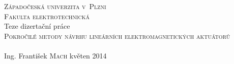 \begin{titlepage}
\begin{center}

\vspace*{3em}
\textsc{\LARGE Západočeská univerzita v~Plzni}\\[0.5em]
\textsc{\LARGE Fakulta elektrotechnická}\\[5em]

{\Large Teze dizertační práce}\vspace*{1em}
\HRule \\[1em]
{\huge \textsc{Pokročilé metody návrhu lineárních elektromagnetických aktuátorů} \\[0.4cm]}
\HRule \\[3em]

{\Large Ing. František \textsc{Mach}}
\vfill
{\large květen 2014}
\end{center}
\end{titlepage}